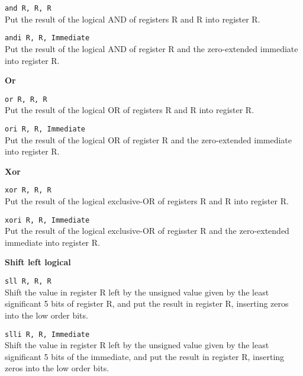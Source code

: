 \documentclass[12pt]{report}
\newcommand\subscr[1]{\raisebox{-0.5ex}{\small #1}}
\newcommand\regs{R\subscr{s}}
\newcommand\regd{R\subscr{d}}
\newcommand\regt{R\subscr{t}}
\begin{document}
\texttt{and \regd, \regs, \regt}\\
Put the result of the logical AND of registers \regs{} and \regt{} into register \regd{}.
\vspace{1ex}

\texttt{andi \regd, \regs, Immediate}\\
Put the result of the logical AND of register \regs{} and the zero-extended immediate into register \regd{}.
\vspace{1ex}

\noindent
{\bf Or}

\texttt{or \regd, \regs, \regt}\\
Put the result of the logical OR of registers \regs{} and \regt{} into register \regd{}.
\vspace{1ex}

\texttt{ori \regd, \regs, Immediate}\\
Put the result of the logical OR of register \regs{} and the zero-extended immediate into register \regd{}.
\vspace{1ex}

\noindent
{\bf Xor}

\texttt{xor \regd, \regs, \regt}\\
Put the result of the logical exclusive-OR of registers \regs{} and \regt{} into register \regd{}.
\vspace{1ex}

\newpage
\texttt{xori \regd, \regs, Immediate}\\
Put the result of the logical exclusive-OR of regisster \regs{} and the zero-extended immediate into register \regd{}.
\vspace{1ex}

\noindent
{\bf Shift left logical}

\texttt{sll \regd, \regs, \regt}\\
Shift the value in register \regs{} left by the unsigned value given by the
least significant 5 bits of register \regt{}, and put the result in register \regd{},
inserting zeros into the low order bits.
\vspace{1ex}

\texttt{slli \regd, \regs, Immediate}\\
Shift the value in register \regs{} left by the unsigned value given by the
least significant 5 bits of the immediate, and put the result in register \regd{},
inserting zeros into the low order bits.
\vspace{1ex}
\end{document}
